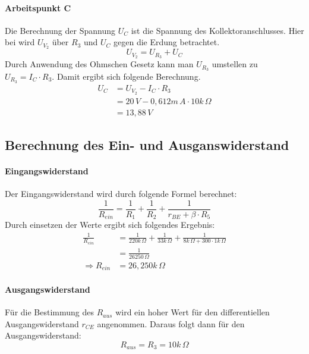             \paragraph{Arbeitspunkt C}
            Die Berechnung der Spannung \(U_C\) ist die Spannung des Kollektoranschlusses. Hier bei wird \(U_{V_2}\) über \(R_3\) und \(U_C\) gegen die Erdung betrachtet.
            \begin{equation*}
                U_{V_2} = U_{R_3}+U_C
            \end{equation*}
            Durch Anwendung des Ohmschen Gesetz kann man \(U_{R_3}\) umstellen zu \(U_{R_3} = I_C\cdot R_3\). Damit ergibt sich folgende Berechnung.
            \begin{align*}
                U_C &= U_{V_2} - I_C \cdot R_3\\
                &= 20\,V - 0,612m\,A \cdot 10k\,\Omega\\
                &=13,88\,V
            \end{align*}
        \subsection{Berechnung des Ein- und Ausganswiderstand}
            \paragraph{Eingangswiderstand}
             Der Eingangswiderstand wird durch folgende Formel berechnet:
             \begin{equation*}
                 \frac{1}{R_{ein}}= \frac{1}{R_1}+\frac{1}{R_2}+\frac{1}{r_{BE}+\beta \cdot R_5}
             \end{equation*}
             Durch einsetzen der Werte ergibt sich folgendes Ergebnis:
             \begin{align*}
                \frac{1}{R_{ein}} & = \frac{1}{220k\,\Omega}+\frac{1}{33k\,\Omega}+\frac{1}{8k\,\Omega+300 \cdot 1k\,\Omega}\\
                 & = \frac{1}{26250\,\Omega}\\
                \Rightarrow R_{ein} & =26,250k\,\Omega
             \end{align*}
             \paragraph{Ausgangswiderstand}
            Für die Bestimmung des \(R_{aus}\) wird ein hoher Wert für den differentiellen Ausgangswiderstand \(r_{CE}\) angenommen. Daraus folgt dann für den Ausgangswiderstand:
            \begin{equation*}
                R_{aus}= R_3 = 10k\,\Omega
            \end{equation*}

